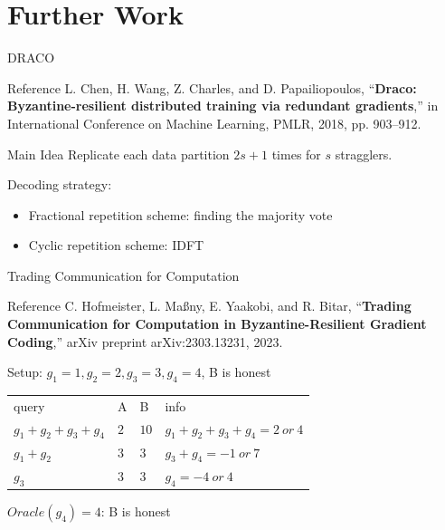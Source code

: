 \documentclass{beamer}
\begin{document}
\section{Further Work}

\begin{frame}{DRACO}
    \begin{block}{Reference}
        L. Chen, H. Wang, Z. Charles, and D. Papailiopoulos, “\textbf{Draco: Byzantine-resilient distributed training via redundant gradients},” in International Conference on Machine Learning, PMLR, 2018, pp. 903–912.
    \end{block}

    \begin{block}{Main Idea}
        Replicate each data partition $2s+1$ times for $s$ stragglers.

        Decoding strategy:
        \begin{itemize}
            \item Fractional repetition scheme: finding the majority vote
            \item Cyclic repetition scheme: IDFT
        \end{itemize}
    \end{block}

\end{frame}

\begin{frame}{Trading Communication for Computation}
    \begin{block}{Reference}
        C. Hofmeister, L. Maßny, E. Yaakobi, and R. Bitar, “\textbf{Trading Communication for Computation in Byzantine-Resilient Gradient Coding},” arXiv preprint arXiv:2303.13231, 2023.
    \end{block}

    \begin{example}
        Setup: $g_1 = 1, g_2 = 2, g_3 = 3, g_4 = 4$, B is honest
        \begin{table}
            \begin{tabular}{llll}
            query                   & A   & B    & info                             \\
            $g_1 + g_2 + g_3 + g_4$ & $2$ & $10$ & $g_1 + g_2 + g_3 + g_4 = 2\ or\ 4$ \\
            $g_1 + g_2$             & $3$ & $3$  & $g_3 + g_4 = -1\ or\ 7$            \\
            $g_3$                   & $3$ & $3$  & $g_4 = -4\ or\ 4$                 
            \end{tabular}
        \end{table}
        $Oracle(g_4) = 4$: B is honest
    \end{example}
\end{frame}
\end{document}
